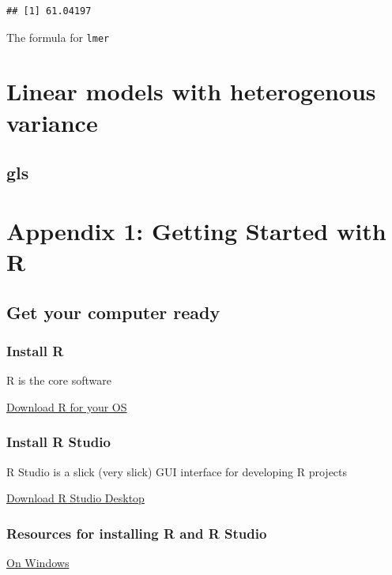 \documentclass[]{book}
\begin{document}
\begin{verbatim}
## [1] 61.04197
\end{verbatim}

The formula for \texttt{lmer}

\chapter{Linear models with heterogenous
variance}\label{linear-models-with-heterogenous-variance}

\section{gls}\label{gls}

\chapter*{Appendix 1: Getting Started with
R}\label{appendix-1-getting-started-with-r}

\section{Get your computer ready}\label{get-your-computer-ready}

\subsection{Install R}\label{install-r}

R is the core software

\href{https://cran.r-project.org}{Download R for your OS}

\subsection{Install R Studio}\label{install-r-studio}

R Studio is a slick (very slick) GUI interface for developing R projects

\href{https://www.rstudio.com/products/rstudio/download/}{Download R
Studio Desktop}

\subsection{Resources for installing R and R
Studio}\label{resources-for-installing-r-and-r-studio}

\href{https://medium.com/@GalarnykMichael/install-r-and-rstudio-on-windows-5f503f708027}{On
Windows}
\end{document}
